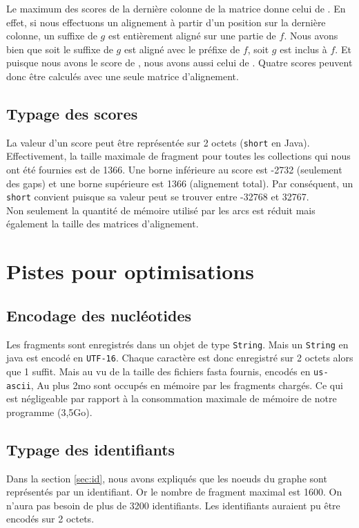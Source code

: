 Le maximum des scores de la dernière colonne de la matrice donne celui de .
En effet, si nous effectuons un alignement à partir d'un position sur la dernière colonne,
un suffixe de $g$ est entièrement aligné sur une partie de $f$.
Nous avons bien que soit le suffixe de $g$ est aligné avec le préfixe de $f$, soit $g$ est inclus à $f$.
Et puisque nous avons le score de , nous avons aussi celui de .
Quatre scores peuvent donc être calculés avec une seule matrice d'alignement.

\subsection{Typage des scores}
La valeur d'un score peut être représentée sur 2 octets (\texttt{short} en Java).
Effectivement, la taille maximale de fragment pour toutes les collections qui
nous ont été fournies est de 1366.
Une borne inférieure au score est -2732 (seulement des gaps)
et une borne supérieure est 1366 (alignement total).
Par conséquent, un \texttt{short} convient puisque sa valeur peut se trouver
entre -32768 et 32767.\\
Non seulement la quantité de mémoire utilisé par les arcs est réduit mais également la taille des matrices d'alignement.

\section{Pistes pour optimisations}
\subsection{Encodage des nucléotides}
Les fragments sont enregistrés dans un objet de type \texttt{String}.
Mais un \texttt{String} en java est encodé en \texttt{UTF-16}.
Chaque caractère est donc enregistré sur 2 octets alors que 1 suffit.
Mais au vu de la taille des fichiers fasta fournis, encodés en \texttt{us-ascii},
Au plus 2mo sont occupés en mémoire par les fragments chargés.
Ce qui est négligeable par rapport à la consommation maximale de mémoire de notre programme (3,5Go).

\subsection{Typage des identifiants}
Dans la section \ref{sec:id}, nous avons expliqués que les noeuds du graphe sont représentés par un identifiant.
Or le nombre de fragment maximal est 1600. On n'aura pas besoin de plus de 3200 identifiants.
Les identifiants auraient pu être encodés sur 2 octets.